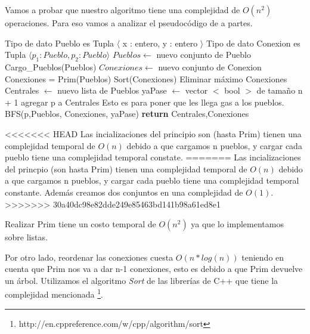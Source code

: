 Vamos a probar que nuestro algoritmo tiene una complejidad de $O(n^2)$ operaciones. Para eso vamos a analizar el pseudocódigo de a partes.

\begin{center}
\begin{pseudo}
\State Tipo de dato Pueblo es Tupla $\langle$ x : entero, y : entero $\rangle$
\State Tipo de dato Conexion es Tupla $\langle p_1 : Pueblo, p_2 : Pueblo \rangle$
        \State $Pueblos \leftarrow$ nuevo conjunto de Pueblo 
        \State Cargo\_Pueblos(Pueblos) 
        \State $Conexiones \leftarrow$ nuevo conjunto de Conexion 
        \State Conexiones = Prim(Pueblos) 
        \State Sort(Conexiones) 
         
	  \State Eliminar máximo Conexiones 
	\EndFor
        \State Centrales $\leftarrow$ nuevo lista de Pueblos 
        \State yaPase $\leftarrow$ vector $<$ bool $>$ de tamaño n + 1 
         
         
        \State agregar p a Centrales 
        \Comment Esto es para poner que les llega gas a los pueblos.
        \State BFS(p,Pueblos, Conexiones, yaPase) 
        \EndIf
        \EndFor
        \State \textbf{return} Centrales,Conexiones 
    \EndProcedure
\end{pseudo}
\end{center}

<<<<<<< HEAD
Las incializaciones del principio son (hasta Prim) tienen una complejidad temporal de $O(n)$ debido a que cargamos n pueblos, y cargar cada pueblo tiene una complejidad temporal constate.
=======
Las incializaciones del princpio (son hasta Prim) tienen una complejidad temporal de $O(n)$ debido a que cargamos n pueblos, y cargar cada pueblo tiene una complejidad temporal constante. Además creamos dos conjuntos en una complejidad de $O(1)$.
>>>>>>> 30a40dc98e82dde249e85463bd141b98a61ed8e1

Realizar Prim tiene un costo temporal de $O(n^2)$ ya que lo implementamos sobre listas.

Por otro lado, reordenar las conexiones cuesta $O(n*log(n))$ teniendo en cuenta que Prim nos va a dar n-1 conexiones, esto es debido a que Prim devuelve un árbol. Utilizamos el algoritmo \emph{Sort} de las librerías de C++ que tiene la complejidad mencionada \footnote{http://en.cppreference.com/w/cpp/algorithm/sort}.

